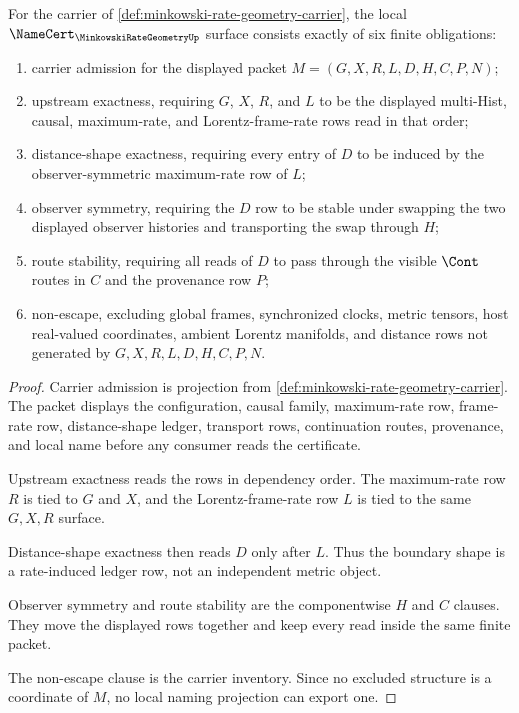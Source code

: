 \begin{theorem}
\label{thm:minkowski-rate-geometry-namecert-obligations}
For the carrier of \autoref{def:minkowski-rate-geometry-carrier}, the local $\NameCert_{\MinkowskiRateGeometryUp}$ surface consists exactly of six finite obligations:
\begin{enumerate}
\item carrier admission for the displayed packet $M=(G,X,R,L,D,H,C,P,N)$;
\item upstream exactness, requiring $G$, $X$, $R$, and $L$ to be the displayed multi-Hist, causal, maximum-rate, and Lorentz-frame-rate rows read in that order;
\item distance-shape exactness, requiring every entry of $D$ to be induced by the observer-symmetric maximum-rate row of $L$;
\item observer symmetry, requiring the $D$ row to be stable under swapping the two displayed observer histories and transporting the swap through $H$;
\item route stability, requiring all reads of $D$ to pass through the visible $\Cont$ routes in $C$ and the provenance row $P$;
\item non-escape, excluding global frames, synchronized clocks, metric tensors, host real-valued coordinates, ambient Lorentz manifolds, and distance rows not generated by $G,X,R,L,D,H,C,P,N$.
\end{enumerate}
\end{theorem}
\begin{proof}
Carrier admission is projection from \autoref{def:minkowski-rate-geometry-carrier}. The packet displays the configuration, causal family, maximum-rate row, frame-rate row, distance-shape ledger, transport rows, continuation routes, provenance, and local name before any consumer reads the certificate.

Upstream exactness reads the rows in dependency order. The maximum-rate row $R$ is tied to $G$ and $X$, and the Lorentz-frame-rate row $L$ is tied to the same $G,X,R$ surface.

Distance-shape exactness then reads $D$ only after $L$. Thus the boundary shape is a rate-induced ledger row, not an independent metric object.

Observer symmetry and route stability are the componentwise $H$ and $C$ clauses. They move the displayed rows together and keep every read inside the same finite packet.

The non-escape clause is the carrier inventory. Since no excluded structure is a coordinate of $M$, no local naming projection can export one.
\end{proof}

